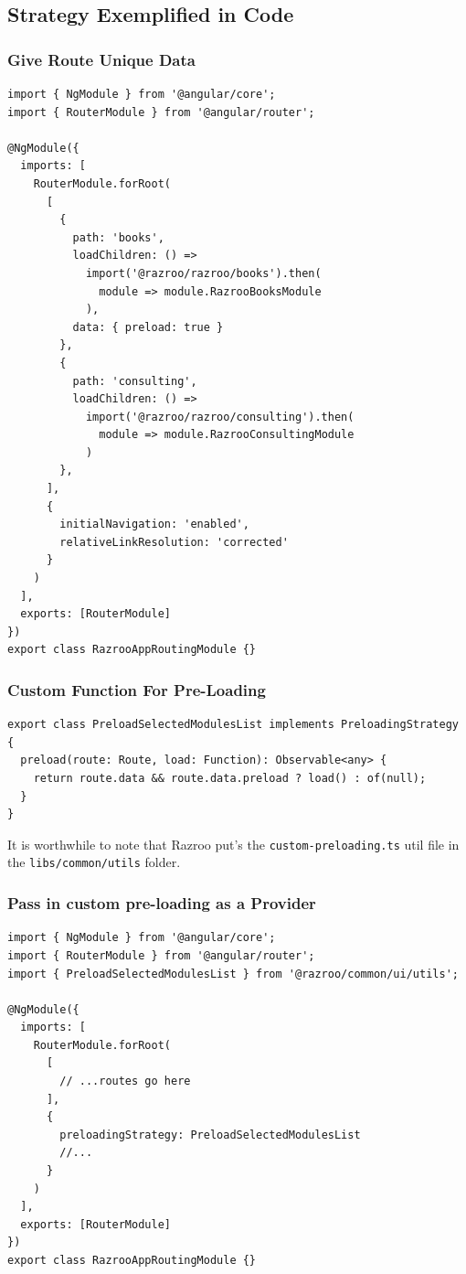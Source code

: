 \subsection{Strategy Exemplified in Code}
\subsubsection{Give Route Unique Data}
\begin{lstlisting}[caption=app.routing.module.ts]
import { NgModule } from '@angular/core';
import { RouterModule } from '@angular/router';

@NgModule({
  imports: [
    RouterModule.forRoot(
      [
        {
          path: 'books',
          loadChildren: () =>
            import('@razroo/razroo/books').then(
              module => module.RazrooBooksModule
            ),
          data: { preload: true }
        },
        {
          path: 'consulting',
          loadChildren: () =>
            import('@razroo/razroo/consulting').then(
              module => module.RazrooConsultingModule
            )
        },
      ],
      {
        initialNavigation: 'enabled',
        relativeLinkResolution: 'corrected'
      }
    )
  ],
  exports: [RouterModule]
})
export class RazrooAppRoutingModule {}
\end{lstlisting}

\subsubsection{Custom Function For Pre-Loading}
\begin{lstlisting}[caption=custom-preloading.ts]
export class PreloadSelectedModulesList implements PreloadingStrategy {
  preload(route: Route, load: Function): Observable<any> {
    return route.data && route.data.preload ? load() : of(null);
  }
}
\end{lstlisting}

It is worthwhile to note that Razroo put's the \lstinline{custom-preloading.ts} 
util file in the \lstinline{libs/common/utils} folder.

\subsubsection{Pass in custom pre-loading as a Provider}
\begin{lstlisting}[caption=app.routing.module.ts]
import { NgModule } from '@angular/core';
import { RouterModule } from '@angular/router';
import { PreloadSelectedModulesList } from '@razroo/common/ui/utils';

@NgModule({
  imports: [
    RouterModule.forRoot(
      [
        // ...routes go here
      ],
      {
        preloadingStrategy: PreloadSelectedModulesList
        //...
      }
    )
  ],
  exports: [RouterModule]
})
export class RazrooAppRoutingModule {}
\end{lstlisting}

